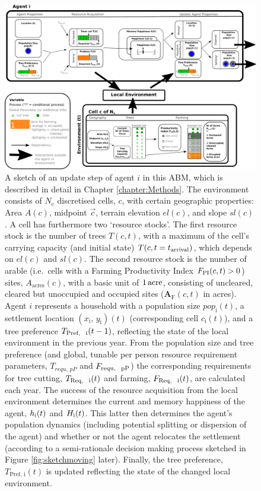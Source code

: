 \begin{figure}[H]
	\centering
	\includegraphics[width=1\textwidth]{images/SketchABM2/sketch.pdf}
	\caption{
		A sketch of an update step of agent $i$ in this ABM, which is described in detail in Chapter \ref{chapter:Methods}.
		The environment consists of $N_\text{c}$ discretised cells, $c$, with certain geographic properties: Area $A(c)$, midpoint $\vec{c}$, terrain elevation $el(c)$, and slope $sl(c)$.  %
		A cell has furthermore two `resource stocks'.
		The first resource stock is the number of trees $T(c,t)$, with a maximum of the cell's carrying capacity (and initial state) $T(c,t=t_{\rm arrival})$, which depends on $el(c)$ and $sl(c)$. 
		The second resource stock is the number of arable (i.e.\ cells with a Farming Productivity Index $F_{\rm PI}(c,t)>0$) sites, $A_\text{acres}(c)$, with a basic unit of $1\, {\rm acre}$, consisting of uncleared, cleared but unoccupied and occupied sites ($\mathbf{A}_\text{F}(c,t)$ in acres).
		Agent $i$ represents a household with a population size $pop_\text{i}(t)$, a settlement location $(x_\text{i},\, y_\text{i})(t)$ (corresponding cell $c_\text{i}(t)$), and a tree preference $T_\text{Pref, \, i}(t-1)$, reflecting the state of the local environment in the previous year. From the population size and tree preference (and global, tunable per person resource requirement parameters, $T_{requ, \, pP}$ and  $F_\text{requ, \, pP}$) the corresponding requirements for tree cutting, $T_\text{Req, \, i}(t)$ and farming, $F_\text{Req, \, i}(t)$, are calculated each year.
		The success of the resource acquisition from the local environment determines the current and memory happiness of the agent, $h_{\rm i}(t)$ and $H_{\rm i}(t)$. %
		This latter then determines the agent's population dynamics (including potential splitting or dispersion of the agent) and whether or not the agent relocates the settlement (according to a semi-rationale decision making process sketched in Figure \ref{fig:sketchmoving} later).
		Finally, the tree preference, $T_\text{Pref, i}(t)$ is updated reflecting the state of the changed local environment.
	}
	\label{fig:SketchABM}
\end{figure}


